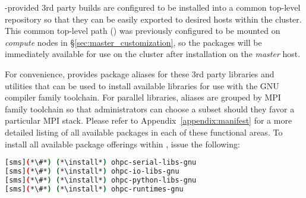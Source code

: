 \begin{center}
\begin{tcolorbox}[]
\small
\OHPC{}-provided 3rd party builds are configured to be installed
into a common top-level repository so that they can be easily exported to
desired hosts within the cluster. This common top-level path
() was previously configured to be mounted on {\em
 compute} nodes in \S\ref{sec:master_customization}, so the packages will be
immediately available for use on the cluster after installation on the {\em
 master} host.
\end{tcolorbox}
\end{center}


For convenience, \OHPC{} provides package aliases for these 3rd party libraries
and utilities that can be used to install available libraries for use with the
GNU compiler family toolchain. For parallel libraries, aliases are grouped by
MPI family toolchain so that administrators can choose a subset should they
favor a particular MPI stack.  Please refer to Appendix~\ref{appendix:manifest}
for a more detailed listing of all available packages in each of these functional
areas. To install all available package offerings within \OHPC{}, issue the
following:

\begin{lstlisting}[language=bash,keywords={},upquote=true,keepspaces]
[sms](*\#*) (*\install*) ohpc-serial-libs-gnu
[sms](*\#*) (*\install*) ohpc-io-libs-gnu
[sms](*\#*) (*\install*) ohpc-python-libs-gnu
[sms](*\#*) (*\install*) ohpc-runtimes-gnu
\end{lstlisting}



